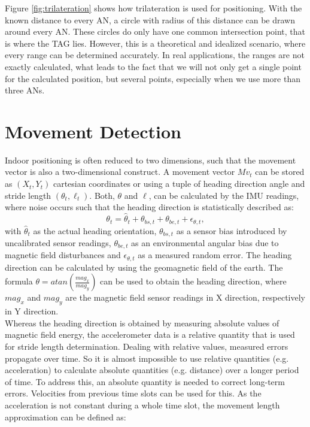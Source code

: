 Figure \ref{fig:trilateration} shows how trilateration is used for positioning. With the known distance to every AN, a circle with radius of this distance can be drawn around every AN. These circles do only have one common intersection point, that is where the TAG lies. However, this is a theoretical and idealized scenario, where every range can be determined accurately. In real applications, the ranges are not exactly calculated, what leads to the fact that we will not only get a single point for the calculated position, but several points, especially when we use more than three ANs.

\section{Movement Detection}
Indoor positioning is often reduced to two dimensions, such that the movement vector is also a two-dimensional construct. A movement vector $Mv_{t}$ can be stored as $(X_{t}, Y_{t})$ cartesian coordinates or using a tuple of heading direction angle and stride length $(\theta_{t}, \ell_{t})$. Both, $\theta$ and $\ell$, can be calculated by the IMU readings, where noise occurs such that the heading direction is statistically described as:
\begin{equation}
\theta_{t} = \hat{\theta}_{t} + \theta_{bs,t} + \theta_{be,t} + \epsilon_{\theta, t},
\label{eqn:heading_direction}
\end{equation}
with $\hat{\theta}_{t}$ as the actual heading orientation,  $\theta_{bs,t}$ as a sensor bias introduced by uncalibrated sensor readings, $\theta_{be,t}$ as an environmental angular bias due to magnetic field disturbances and $\epsilon_{\theta, t}$ as a measured random error. The heading direction can be calculated by using the geomagnetic field of the earth. The formula $\theta = atan(\frac{mag_{x}}{mag_{y}})$ can be used to obtain the heading direction, where $mag_{x}$ and $mag_{y}$ are the magnetic field sensor readings in X direction, respectively in Y direction.\\
\noindent\hspace*{5mm}%
Whereas the heading direction is obtained by measuring absolute values of magnetic field energy, the accelerometer data is a relative quantity that is used for stride length determination. Dealing with relative values, measured errors propagate over time. So it is almost impossible to use relative quantities (e.g. acceleration) to calculate absolute quantities (e.g. distance) over a longer period of time. To address this, an absolute quantity is needed to correct long-term errors. Velocities from previous time slots can be used for this. As the acceleration is not constant during a whole time slot, the movement length approximation can be defined as: 

